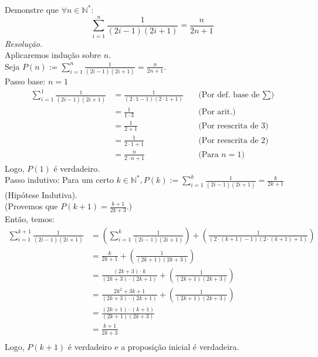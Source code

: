 Demonstre que $\forall n \in \mathbb{N}^*$:
\begin{displaymath}
	\sum\limits_{i=1}^n \frac{1}{(2i - 1) (2i + 1)} = \frac{n}{2n + 1}
\end{displaymath}
\emph{Resolução.} \\
Aplicaremos indução sobre $n$. \\
Seja $P(n) := \sum\limits_{i=1}^n \frac{1}{(2i - 1) (2i + 1)} = \frac{n}{2n + 1}$. \\
Passo base: $n = 1$
\begin{align*}
	\sum\limits_{i=1}^1 \frac{1}{(2i - 1) (2i + 1)}
	 & = \frac{1}{(2\cdot1 - 1) (2\cdot1 + 1)} & \quad \text{(Por def. base de $\sum$)} \\
	 & = \frac{1}{1 \cdot 3}                   & \quad \text{(Por arit.)}               \\
	 & = \frac{1}{2 + 1}                       & \quad \text{(Por reescrita de 3)}      \\
	 & = \frac{1}{2 \cdot 1 + 1}               & \quad \text{(Por reescrita de 2)}      \\
	 & = \frac{n}{2 \cdot n + 1}               & \quad \text{(Para $n = 1$)}
\end{align*}
Logo, $P(1)$ é verdadeiro. \\
Passo indutivo: Para um certo $k \in \mathbb{N}^*, P(k) := \sum\limits_{i = 1}^k \frac{1}{(2i - 1) (2i + 1)} = \frac{k}{2k + 1}$ (Hipótese Indutiva). \\
(Provemos que $P(k + 1) = \frac{k + 1}{2k + 3}$.) \\
Então, temos:
\begin{align*}
	\sum\limits_{i=1}^{k + 1} \frac{1}{(2i - 1) (2i + 1)}
	 & =	(\sum\limits_{i=1}^{k} \frac{1}{(2i - 1) (2i + 1)}) + (\frac{1}{(2 \cdot (k + 1) - 1) (2 \cdot (k + 1) + 1)}) \\
	 & =	\frac{k}{2k + 1} + (\frac{1}{(2k + 1) (2k + 3)})                                                              \\
	 & =	\frac{(2k + 3) \cdot k}{(2k + 3) \cdot (2k + 1)} + (\frac{1}{(2k + 1) (2k + 3)})                              \\
	 & =	\frac{2k^2 + 3k + 1}{(2k + 3) \cdot (2k + 1)} + (\frac{1}{(2k + 1) (2k + 3)})                                 \\
	 & = 	\frac{(2k + 1) \cdot (k + 1)}{(2k + 1) (2k + 3)}                                                             \\
	 & = 	\frac{k + 1}{2k + 3}                                                                                         \\
\end{align*}
Logo, $P(k + 1)$ é verdadeiro e a proposição inicial é verdadeira.

